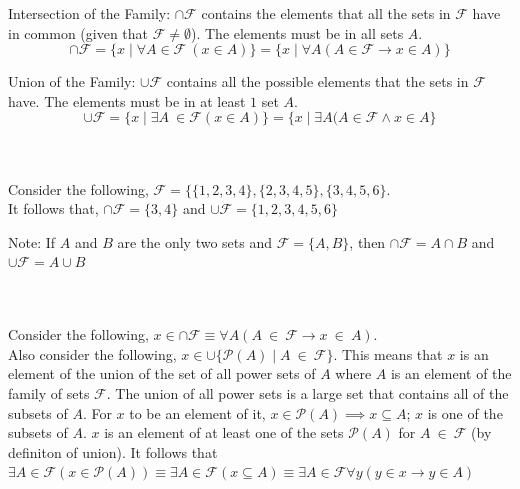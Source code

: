 \documentclass[../setup.tex]{subfiles}
\begin{document}
\begin{theorem}
Intersection of the Family: $\boldsymbol{\cap\mathcal{F}}$ contains the elements that all the sets in $\mathcal{F}$ have in common (given that $\mathcal{F} \neq \emptyset$). The elements must be in all sets $A$. \\
\[\cap\mathcal{F} = \{x \mid \forall A \in \mathcal{F} \ (x \in A)\} = \{x \mid \forall A (A \in \mathcal{F} \rightarrow x \in A)\}\]
\end{theorem}

\begin{theorem}
Union of the Family: $\boldsymbol{\cup\mathcal{F}}$ contains all the possible elements that the sets in $\mathcal{F}$ have. The elements must be in at least $1$ set $A$. \\
\[\cup\mathcal{F} = \{x \mid \exists A\ \in \mathcal{F} (x \in A)\} = \{x \mid \exists A (A \in \mathcal{F} \land x \in A\}\]
\end{theorem}

\phantom \\ \\
Consider the following, $\mathcal{F} = \{\{1, 2, 3, 4\}, \{2, 3, 4, 5\}, \{3, 4, 5, 6\}$. \\
It follows that, $\cap\mathcal{F} = \{3, 4\}$ and $\cup\mathcal{F} = \{1, 2, 3, 4, 5, 6\}$ 

\begin{remark}
	Note: If $A$ and $B$ are the only two sets and $\mathcal{F} = \{A, B\}$, then $\cap\mathcal{F} = A \cap B$ and $\cup\mathcal{F} = A \cup B$
\end{remark}

\phantom \\ \\
Consider the following, $x \in \cap\mathcal{F} \equiv \forall A(A \ \in \ \mathcal{F} \rightarrow x \ \in \ A)$. \\
Also consider the following, $x \in \cup \{\mathcal{P}(A) \mid A \ \in \ \mathcal{F}\}$. This means that $x$ is an element of the union of the set of all power sets of $A$ where $A$ is an element of the family of sets $\mathcal{F}$. The union of all power sets is a large set that contains all of the subsets of $A$. For $x$ to be an element of it, $x \in \mathcal{P}(A) \implies x \subseteq A$; $x$ is one of the subsets of $A$. $x$ is an element of at least one of the sets $\mathcal{P}(A)$ for $A \ \in \ \mathcal{F}$ (by definiton of union). It follows that $\exists A \in \mathcal{F} (x \in \mathcal{P}(A)) \equiv \exists A \in \mathcal{F} (x \subseteq A) \equiv \exists A \in \mathcal{F} \forall y (y \in x \rightarrow y \in A)$
\end{document}
